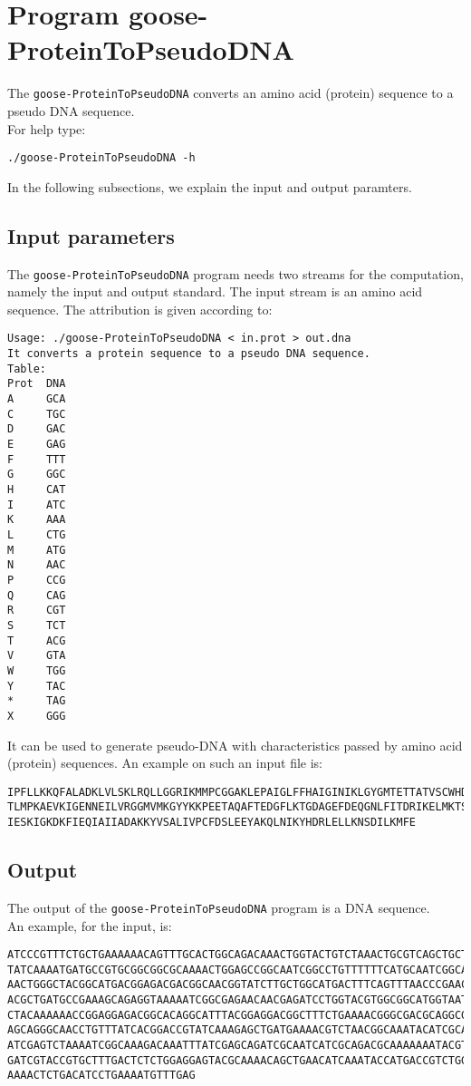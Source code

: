 \section{Program goose-ProteinToPseudoDNA}

The \texttt{goose-ProteinToPseudoDNA} converts an amino acid (protein) sequence to a pseudo DNA sequence.\\
For help type:
\begin{lstlisting}
./goose-ProteinToPseudoDNA -h
\end{lstlisting}
In the following subsections, we explain the input and output paramters.

\subsection{Input parameters}

The \texttt{goose-ProteinToPseudoDNA} program needs two streams for the computation,
namely the input and output standard. The input stream is an amino acid sequence.
The attribution is given according to:
\begin{lstlisting}
Usage: ./goose-ProteinToPseudoDNA < in.prot > out.dna
It converts a protein sequence to a pseudo DNA sequence.
Table:
Prot  DNA
A	  GCA
C	  TGC
D	  GAC
E	  GAG
F	  TTT
G	  GGC
H	  CAT
I	  ATC
K	  AAA
L	  CTG
M	  ATG
N	  AAC
P	  CCG
Q	  CAG
R	  CGT
S     TCT
T	  ACG
V	  GTA
W	  TGG
Y	  TAC
*	  TAG
X	  GGG
\end{lstlisting}
It can be used to generate pseudo-DNA with characteristics passed by amino acid (protein) sequences. An example on such an input file is:
\begin{lstlisting}
IPFLLKKQFALADKLVLSKLRQLLGGRIKMMPCGGAKLEPAIGLFFHAIGINIKLGYGMTETTATVSCWHDFQFNPNSIG
TLMPKAEVKIGENNEILVRGGMVMKGYYKKPEETAQAFTEDGFLKTGDAGEFDEQGNLFITDRIKELMKTSNGKYIAPQY
IESKIGKDKFIEQIAIIADAKKYVSALIVPCFDSLEEYAKQLNIKYHDRLELLKNSDILKMFE
\end{lstlisting}

\subsection{Output}

The output of the \texttt{goose-ProteinToPseudoDNA} program is a DNA sequence.\\
An example, for the input, is:
\begin{lstlisting}
ATCCCGTTTCTGCTGAAAAAACAGTTTGCACTGGCAGACAAACTGGTACTGTCTAAACTGCGTCAGCTGCTGGGCGGCCG
TATCAAAATGATGCCGTGCGGCGGCGCAAAACTGGAGCCGGCAATCGGCCTGTTTTTTCATGCAATCGGCATCAACATCA
AACTGGGCTACGGCATGACGGAGACGACGGCAACGGTATCTTGCTGGCATGACTTTCAGTTTAACCCGAACTCTATCGGC
ACGCTGATGCCGAAAGCAGAGGTAAAAATCGGCGAGAACAACGAGATCCTGGTACGTGGCGGCATGGTAATGAAAGGCTA
CTACAAAAAACCGGAGGAGACGGCACAGGCATTTACGGAGGACGGCTTTCTGAAAACGGGCGACGCAGGCGAGTTTGACG
AGCAGGGCAACCTGTTTATCACGGACCGTATCAAAGAGCTGATGAAAACGTCTAACGGCAAATACATCGCACCGCAGTAC
ATCGAGTCTAAAATCGGCAAAGACAAATTTATCGAGCAGATCGCAATCATCGCAGACGCAAAAAAATACGTATCTGCACT
GATCGTACCGTGCTTTGACTCTCTGGAGGAGTACGCAAAACAGCTGAACATCAAATACCATGACCGTCTGGAGCTGCTGA
AAAACTCTGACATCCTGAAAATGTTTGAG
\end{lstlisting}
